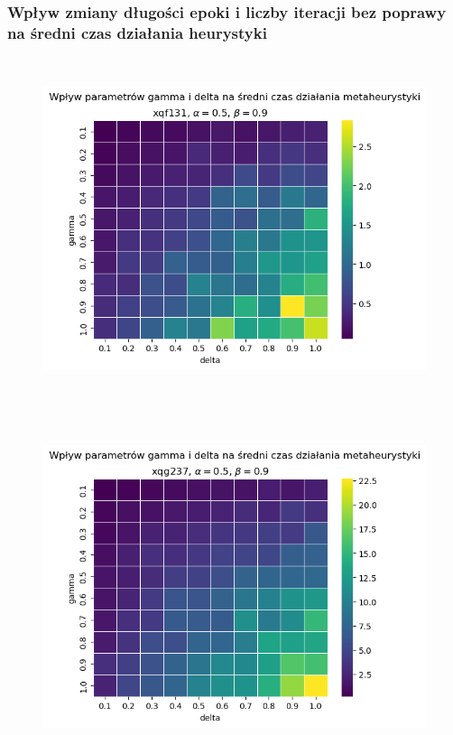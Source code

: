 \documentclass{article}
\begin{document}
\subsubsection{Wpływ zmiany długości epoki i liczby iteracji bez poprawy na średni czas działania heurystyki}
    \begin{figure}[h!]
        \centering
        \includegraphics[height=10.0cm]{../../plots/sa-tuning-gamma-delta-time-xqf131.png}
    \end{figure}

    \begin{figure}[h!]
        \centering
        \includegraphics[height=10.0cm]{../../plots/sa-tuning-gamma-delta-time-xqg237.png}
    \end{figure}
\end{document}
